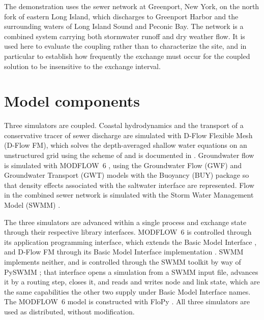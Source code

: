 \documentclass[preprint,authoryear,11pt]{elsarticle}
\begin{document}
The demonstration uses the sewer network at Greenport, New York, on the north fork of eastern Long Island, which discharges to Greenport Harbor and the surrounding waters of Long Island Sound and Peconic Bay. The network is a combined system carrying both stormwater runoff and dry weather flow. It is used here to evaluate the coupling rather than to characterize the site, and in particular to establish how frequently the exchange must occur for the coupled solution to be insensitive to the exchange interval.

\section{Model components}

Three simulators are coupled. Coastal hydrodynamics and the transport of a conservative tracer of sewer discharge are simulated with D-Flow Flexible Mesh (D-Flow FM), which solves the depth-averaged shallow water equations on an unstructured grid using the scheme of \cite{kernkamp2011unstructured} and is documented in \cite{deltares2026dflowfm}. Groundwater flow is simulated with MODFLOW~6 \citep{langevin2017modflow6}, using the Groundwater Flow (GWF) and Groundwater Transport (GWT) models with the Buoyancy (BUY) package so that density effects associated with the saltwater interface are represented. Flow in the combined sewer network is simulated with the Storm Water Management Model (SWMM) \citep{rossman2022swmm}.

The three simulators are advanced within a single process and exchange state through their respective library interfaces. MODFLOW~6 is controlled through its application programming interface, which extends the Basic Model Interface \citep{hughes2022modflowapi}, and D-Flow FM through its Basic Model Interface implementation \citep{hutton2020bmi}. SWMM implements neither, and is controlled through the SWMM toolkit by way of PySWMM \citep{mcdonnell2020pyswmm}; that interface opens a simulation from a SWMM input file, advances it by a routing step, closes it, and reads and writes node and link state, which are the same capabilities the other two supply under Basic Model Interface names. The MODFLOW~6 model is constructed with FloPy \citep{hughes2023flopy}. All three simulators are used as distributed, without modification.
\end{document}
